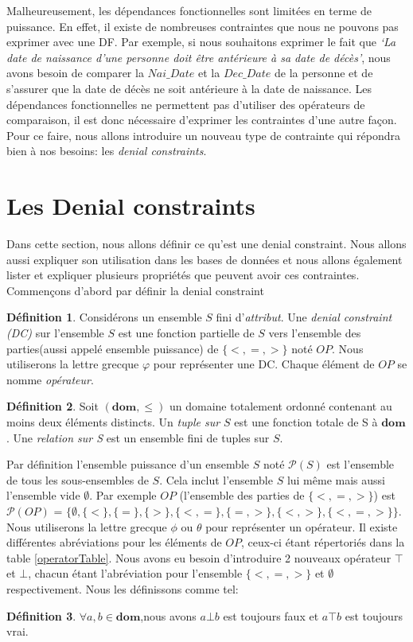 \documentclass[letterpaper, 12pt]{report}
\theoremstyle{definition}
\newtheorem{mydef}{Définition}
\newcommand{\dom}{\mathbf{dom}}
\begin{document}
Malheureusement, les dépendances fonctionnelles sont limitées en terme de puissance. En effet, il existe de nombreuses contraintes que nous ne pouvons pas exprimer avec une DF. Par exemple, si nous souhaitons exprimer le fait que \emph{`La date de naissance d'une personne doit être antérieure à sa date de décès'}, nous avons besoin de comparer la $Nai\_Date$ et la $Dec\_Date$ de la personne et de s'assurer que la date de décès ne soit antérieure à la date de naissance. Les dépendances fonctionnelles ne permettent pas d'utiliser des opérateurs de comparaison, il est donc nécessaire d'exprimer les contraintes d'une autre façon. Pour ce faire, nous allons introduire un nouveau type de contrainte qui répondra bien à nos besoins: les \emph{denial constraints}.

\section{Les Denial constraints}

Dans cette section, nous allons définir ce qu'est une denial constraint. Nous allons aussi expliquer son utilisation dans les bases de données et nous allons également lister et expliquer plusieurs propriétés que peuvent avoir ces contraintes. Commençons d'abord par définir la denial constraint

\begin{mydef}
Considérons un ensemble $S$ fini d'\emph{attribut}. Une \emph{denial constraint (DC)} sur l'ensemble $S$ est une fonction partielle de $S$ vers l'ensemble des parties(aussi appelé ensemble puissance) de $\{ <,=,> \}$ noté $OP$. Nous utiliserons la lettre grecque $\varphi$ pour représenter une DC. Chaque élément de $OP$ se nomme \emph{opérateur}.
\end{mydef}

\begin{mydef}
 Soit $(\dom,\leq)$ un domaine totalement ordonné contenant au moins deux éléments distincts. Un \emph{tuple sur $S$} est une fonction totale de S à $\dom$. Une \emph{relation sur S} est un ensemble fini de tuples sur $S$. 
\end{mydef}

Par définition l'ensemble puissance d'un ensemble $S$ noté $\mathcal{P}(S)$ est l'ensemble de tous les sous-ensembles de $S$. Cela inclut l'ensemble $S$ lui même mais aussi l'ensemble vide $\emptyset$. Par exemple $OP$ (l'ensemble des parties de $\{ <, =, > \}$) est $\mathcal{P}(OP)$ = $\{ \emptyset, \{<\} , \{=\}, \{>\}, \{<,=\}, \{=,>\}, \{<,>\}, \{<,=,>\} \}$. Nous utiliserons la lettre grecque $\phi$ ou $\theta$ pour représenter un opérateur. Il existe différentes abréviations pour les éléments de $OP$, ceux-ci étant répertoriés dans la table \ref{operatorTable}. Nous avons eu besoin d'introduire 2 nouveaux opérateur $\top$ et $\bot$, chacun étant l'abréviation pour l'ensemble $\{<,=,>\}$ et $\emptyset$ respectivement. Nous les définissons comme tel: 
\begin{mydef}$ \forall a,b \in \mathbf{dom}$,nous avons $a \bot b$ est toujours faux et $a \top b$ est toujours vrai. 
\end{mydef}
\end{document}
